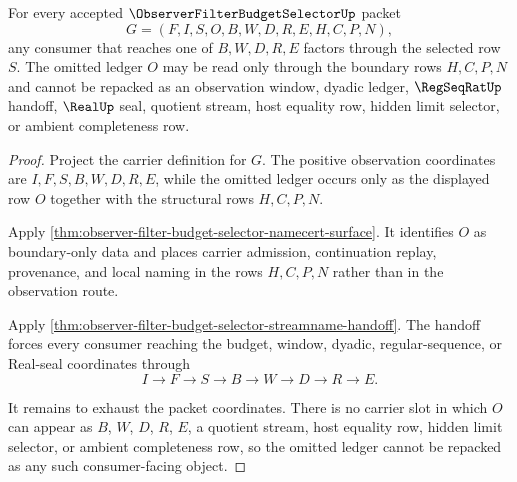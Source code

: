 \begin{theorem}
\label{thm:observer-filter-budget-selector-omitted-row-exclusion}
For every accepted $\ObserverFilterBudgetSelectorUp$ packet
$$
G=(F,I,S,O,B,W,D,R,E,H,C,P,N),
$$
any consumer that reaches one of $B,W,D,R,E$ factors through the selected row $S$. The omitted ledger $O$ may be read only through the boundary rows $H,C,P,N$ and cannot be repacked as an observation window, dyadic ledger, $\RegSeqRatUp$ handoff, $\RealUp$ seal, quotient stream, host equality row, hidden limit selector, or ambient completeness row.
\end{theorem}
\begin{proof}
Project the carrier definition for $G$. The positive observation coordinates are $I,F,S,B,W,D,R,E$, while the omitted ledger occurs only as the displayed row $O$ together with the structural rows $H,C,P,N$.

Apply \autoref{thm:observer-filter-budget-selector-namecert-surface}. It identifies $O$ as boundary-only data and places carrier admission, continuation replay, provenance, and local naming in the rows $H,C,P,N$ rather than in the observation route.

Apply \autoref{thm:observer-filter-budget-selector-streamname-handoff}. The handoff forces every consumer reaching the budget, window, dyadic, regular-sequence, or Real-seal coordinates through
$$
I \to F \to S \to B \to W \to D \to R \to E.
$$

It remains to exhaust the packet coordinates. There is no carrier slot in which $O$ can appear as $B$, $W$, $D$, $R$, $E$, a quotient stream, host equality row, hidden limit selector, or ambient completeness row, so the omitted ledger cannot be repacked as any such consumer-facing object.
\end{proof}

